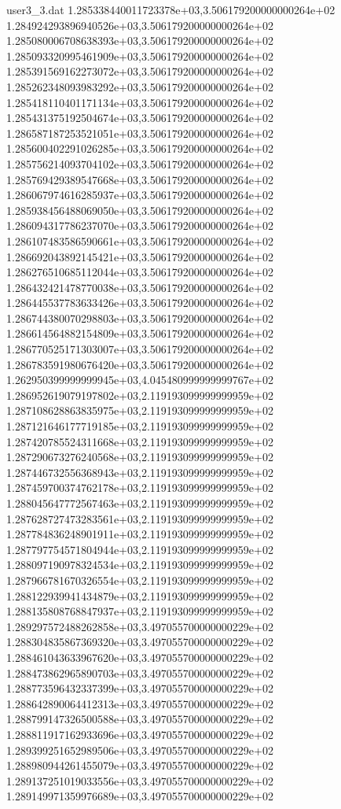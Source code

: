 \begin{filecontents}{user3_3.dat}
1.285338440011723378e+03,3.506179200000000264e+02
1.284924293896940526e+03,3.506179200000000264e+02
1.285080006708638393e+03,3.506179200000000264e+02
1.285093320995461909e+03,3.506179200000000264e+02
1.285391569162273072e+03,3.506179200000000264e+02
1.285262348093983292e+03,3.506179200000000264e+02
1.285418110401171134e+03,3.506179200000000264e+02
1.285431375192504674e+03,3.506179200000000264e+02
1.286587187253521051e+03,3.506179200000000264e+02
1.285600402291026285e+03,3.506179200000000264e+02
1.285756214093704102e+03,3.506179200000000264e+02
1.285769429389547668e+03,3.506179200000000264e+02
1.286067974616285937e+03,3.506179200000000264e+02
1.285938456488069050e+03,3.506179200000000264e+02
1.286094317786237070e+03,3.506179200000000264e+02
1.286107483586590661e+03,3.506179200000000264e+02
1.286692043892145421e+03,3.506179200000000264e+02
1.286276510685112044e+03,3.506179200000000264e+02
1.286432421478770038e+03,3.506179200000000264e+02
1.286445537783633426e+03,3.506179200000000264e+02
1.286744380070298803e+03,3.506179200000000264e+02
1.286614564882154809e+03,3.506179200000000264e+02
1.286770525171303007e+03,3.506179200000000264e+02
1.286783591980676420e+03,3.506179200000000264e+02
1.262950399999999945e+03,4.045480999999999767e+02
1.286952619079197802e+03,2.119193099999999959e+02
1.287108628863835975e+03,2.119193099999999959e+02
1.287121646177719185e+03,2.119193099999999959e+02
1.287420785524311668e+03,2.119193099999999959e+02
1.287290673276240568e+03,2.119193099999999959e+02
1.287446732556368943e+03,2.119193099999999959e+02
1.287459700374762178e+03,2.119193099999999959e+02
1.288045647772567463e+03,2.119193099999999959e+02
1.287628727473283561e+03,2.119193099999999959e+02
1.287784836248901911e+03,2.119193099999999959e+02
1.287797754571804944e+03,2.119193099999999959e+02
1.288097190978324534e+03,2.119193099999999959e+02
1.287966781670326554e+03,2.119193099999999959e+02
1.288122939941434879e+03,2.119193099999999959e+02
1.288135808768847937e+03,2.119193099999999959e+02
1.289297572488262858e+03,3.497055700000000229e+02
1.288304835867369320e+03,3.497055700000000229e+02
1.288461043633967620e+03,3.497055700000000229e+02
1.288473862965890703e+03,3.497055700000000229e+02
1.288773596432337399e+03,3.497055700000000229e+02
1.288642890064412313e+03,3.497055700000000229e+02
1.288799147326500588e+03,3.497055700000000229e+02
1.288811917162933696e+03,3.497055700000000229e+02
1.289399251652989506e+03,3.497055700000000229e+02
1.288980944261455079e+03,3.497055700000000229e+02
1.289137251019033556e+03,3.497055700000000229e+02
1.289149971359976689e+03,3.497055700000000229e+02

\end{filecontents}

